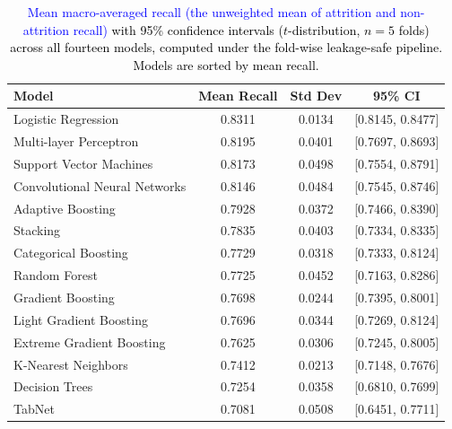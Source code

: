 \documentclass[a4paper,fleqn]{cas-sc}
\begin{document}
\begin{table}[pos=h]
\centering
\caption{\textcolor{black}{\textcolor{blue}{Mean macro-averaged recall (the unweighted mean of attrition and non-attrition recall)} with 95\% confidence intervals ($t$-distribution, $n=5$ folds) across all fourteen models, computed under the fold-wise leakage-safe pipeline. Models are sorted by mean recall.}}
\label{tab:recall_ci}
\begin{tabular}{lccc}
\toprule
\textbf{Model} & \textbf{Mean Recall} & \textbf{Std Dev} & \textbf{95\% CI} \\
\midrule
Logistic Regression & 0.8311 & 0.0134 & [0.8145, 0.8477] \\
Multi-layer Perceptron & 0.8195 & 0.0401 & [0.7697, 0.8693] \\
Support Vector Machines & 0.8173 & 0.0498 & [0.7554, 0.8791] \\
Convolutional Neural Networks & 0.8146 & 0.0484 & [0.7545, 0.8746] \\
Adaptive Boosting & 0.7928 & 0.0372 & [0.7466, 0.8390] \\
Stacking & 0.7835 & 0.0403 & [0.7334, 0.8335] \\
Categorical Boosting & 0.7729 & 0.0318 & [0.7333, 0.8124] \\
Random Forest & 0.7725 & 0.0452 & [0.7163, 0.8286] \\
Gradient Boosting & 0.7698 & 0.0244 & [0.7395, 0.8001] \\
Light Gradient Boosting & 0.7696 & 0.0344 & [0.7269, 0.8124] \\
Extreme Gradient Boosting & 0.7625 & 0.0306 & [0.7245, 0.8005] \\
K-Nearest Neighbors & 0.7412 & 0.0213 & [0.7148, 0.7676] \\
Decision Trees & 0.7254 & 0.0358 & [0.6810, 0.7699] \\
TabNet & 0.7081 & 0.0508 & [0.6451, 0.7711] \\
\bottomrule
\end{tabular}
\end{table}
\end{document}
